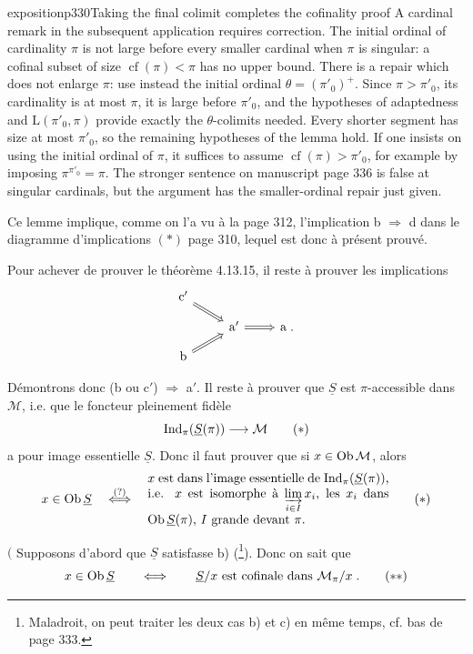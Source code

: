 \begin{dcomment}{exposition}{p330}{Taking the final colimit completes the cofinality proof}
A cardinal remark in the subsequent application requires correction. The initial ordinal of cardinality $\pi$ is not large before every smaller cardinal when $\pi$ is singular: a cofinal subset of size $\operatorname{cf}(\pi)<\pi$ has no upper bound. There is a repair which does not enlarge $\pi$: use instead the initial ordinal $\theta=(\pi'_0)^+$. Since $\pi>\pi'_0$, its cardinality is at most $\pi$, it is large before $\pi'_0$, and the hypotheses of adaptedness and $\mathrm L(\pi'_0,\pi)$ provide exactly the $\theta$-colimits needed. Every shorter segment has size at most $\pi'_0$, so the remaining hypotheses of the lemma hold. If one insists on using the initial ordinal of $\pi$, it suffices to assume $\operatorname{cf}(\pi)>\pi'_0$, for example by imposing $\pi^{\pi'_0}=\pi$. The stronger sentence on manuscript page 336 is false at singular cardinals, but the argument has the smaller-ordinal repair just given.
\end{dcomment}


Ce lemme implique, comme on l'a vu à la page 312, l'implication b $\Longrightarrow$ d dans le diagramme d'implications $(*)$ page 310, lequel est donc à présent prouvé.

Pour achever de prouver le théorème 4.13.15, il reste à prouver les implications
\[
\begin{tikzcd}[row sep=small]
\mathrm{c}' \arrow[dr, Rightarrow] & & \\
& \mathrm{a}' \arrow[r, Rightarrow] & \mathrm{a} \; . \\
\mathrm{b} \arrow[ur, Rightarrow] & &
\end{tikzcd}
\]

Démontrons donc (b ou c$'$) $\Longrightarrow$ a$'$. Il reste à prouver que $\underline{S}$ est $\pi$-accessible dans $\mathcal{M}$, i.e. que le foncteur pleinement fidèle
\[
\Ind_\pi(\underline{S}(\pi)) \longrightarrow \mathcal{M} \tag*{$(*)$}
\]
a pour image essentielle $\underline{S}$. Donc il faut prouver que si $x \in \operatorname{Ob}\mathcal{M}$, alors
\[
x \in \Ob\underline{S} \quad \overset{(?)}{\Longleftrightarrow} \quad
\begin{minipage}[c]{0.55\textwidth}
$x$ est dans l'image essentielle de $\Ind_\pi(\underline{S}(\pi))$, i.e. $x$ est isomorphe à $\varinjlim\limits_{i\in I} x_i$, les $x_i$ dans $\Ob\underline{S}(\pi)$, $I$ grande devant $\pi$.
\end{minipage}
\tag*{$(*)$}
\]


$\Bigg($ Supposons d'abord que $\underline{S}$ satisfasse b) (\footnote[141]{Maladroit, on peut traiter les deux cas b) et c) en même temps, cf. bas de page 333.}). Donc on sait que
\[
x \in \Ob\underline{S} \qquad \Longleftrightarrow \qquad \underline{S}/x \text{ est cofinale dans } \mathcal{M}_\pi/x \; . \tag*{$(**)$}
\]

